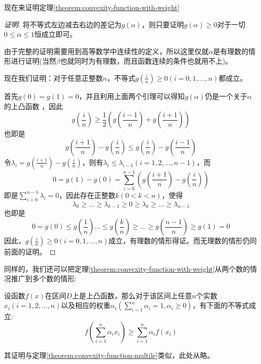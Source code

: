 现在来证明定理\ref{theorem:convexity-function-with-weight}
\begin{proof}[证明]
将不等式左边减去右边的差记为$g(\alpha)$，则只要证明$g(\alpha) \geqslant 0$对于一切$0 \leqslant \alpha \leqslant 1$恒成立即可。

  由于完整的证明需要用到高等数学中连续性的定义，所以这里仅就$\alpha$是有理数的情形进行证明(当然$\beta$也就同时为有理数，而且函数连续的条件也就用不上)。

现在我们证明：对于任意正整数$n$，不等式$g(\frac{i}{n}) \geqslant 0 (i=0,1,\ldots,n)$都成立。

首先$g(0)=g(1)=0$，并且利用上面两个引理可以得知$g(\alpha)$仍是一个关于$\alpha$的上凸函数 ，因此
\begin{equation*}
  g(\frac{i}{n}) \geqslant \frac{1}{2} \left( g(\frac{i-1}{n}) + g(\frac{i+1}{n}) \right)
\end{equation*}
也即是
\begin{equation*}
  g(\frac{i+1}{n}) - g(\frac{i}{n}) \leqslant g(\frac{i}{n}) - g(\frac{i-1}{n})
\end{equation*}
令$\lambda_i = g(\frac{i+1}{n}) - g(\frac{i}{n})$，则有$\lambda_i \leqslant \lambda_{i-1}(i=1,2,\ldots,n-1)$，而
\begin{equation*}
 0 = g(1) - g(0) = \sum_{i=0}^{n-1} \left( g(\frac{i+1}{n}) - g(\frac{i}{n}) \right) 
\end{equation*}
即是$\sum_{i=0}^{n-1}\lambda_i=0$，因此存在正整数$k(0<k<n)$，使得
\begin{equation*}
\lambda_0 \geqslant \dots \geqslant \lambda_{k-1} \geqslant 0 \geqslant \lambda_k \geqslant \ldots \geqslant \lambda_{n-1}
\end{equation*}
也即是
\begin{equation*}
  0 = g(0) \leqslant g(\frac{1}{n}) \ldots \leqslant g(\frac{k}{n}) \geqslant \ldots \geqslant g(\frac{n-1}{n}) \geqslant g(1) = 0
\end{equation*}
因此，$g(\frac{i}{n})\geqslant 0(i=0,1,\ldots,n)$成立，有理数的情形得证。而无理数的情形仍同前面的证明。
\end{proof}

同样的，我们还可以把定理\ref{theorem:convexity-function-with-weight}从两个数的情况推广到多个数的情形:
\begin{theorem}
 设函数$f(x)$在区间$D$上是上凸函数，那么对于该区间上任意$n$个实数$x_i(i=1,2,\ldots,n)$以及相应的权重$\alpha_i(\sum_{i=1}^n\alpha_i=1,\alpha_i \geqslant 0)$，有下面的不等式成立:
 \begin{equation}
   \label{eq:convexity-function-with-weight-multiple}
   f \left( \sum_{i=1}^n\alpha_i x_i \right) \geqslant \sum_{i=1}^n\alpha_i f(x_i)
 \end{equation}
\end{theorem}
其证明与定理\ref{theorem:convexity-function-multile}类似，此处从略。

